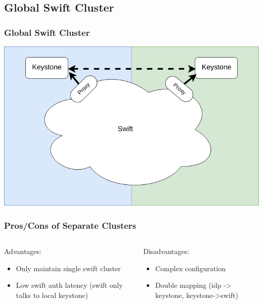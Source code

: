 \documentclass[aspectratio=169,11pt,hyperref={colorlinks=true}]{beamer}
\begin{document}
\subsection{Global Swift Cluster}
\begin{frame}
\frametitle{Global Swift Cluster}
\centering
\includegraphics[width=.775\textwidth]{swift-federation-global.png}
\end{frame}

\begin{frame}
\frametitle{Pros/Cons of Separate Clusters}
\begin{columns}[T]
    \begin{column}{.48\textwidth}
        Advantages:
        \begin{itemize}
            \item Only maintain single swift cluster
            \item Low swift auth latency (swift only talks to local keystone)
        \end{itemize}
    \end{column}
    \begin{column}{.48\textwidth}
        Disadvantages:
        \begin{itemize}
            \item Complex configuration
            \item Double mapping (idp -> keystone, keystone->swift)
        \end{itemize}
    \end{column}
\end{columns}
\end{frame}
\end{document}
